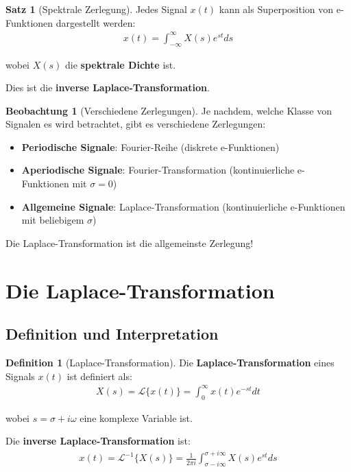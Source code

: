 ﻿\documentclass[a4paper,12pt]{report}
\theoremstyle{definition}
\newtheorem{definition}{Definition}
\newtheorem{satz}{Satz}
\newtheorem{beobachtung}{Beobachtung}
\begin{document}
	\begin{satz}[Spektrale Zerlegung]
		Jedes Signal $x(t)$ kann als Superposition von e-Funktionen dargestellt werden:
		\begin{align}
			x(t) = \int_{-\infty}^{\infty} X(s) e^{st} ds
		\end{align}
		
		wobei $X(s)$ die \textbf{spektrale Dichte} ist.
		
		Dies ist die \textbf{inverse Laplace-Transformation}.
	\end{satz}
	
	\begin{beobachtung}[Verschiedene Zerlegungen]
		Je nachdem, welche Klasse von Signalen es wird betrachtet, gibt es verschiedene Zerlegungen:
		\begin{itemize}
			\item[-] \textbf{Periodische Signale}: Fourier-Reihe (diskrete e-Funktionen)
			\item[-] \textbf{Aperiodische Signale}: Fourier-Transformation (kontinuierliche e-Funktionen mit $\sigma = 0$)
			\item[-] \textbf{Allgemeine Signale}: Laplace-Transformation (kontinuierliche e-Funktionen mit beliebigem $\sigma$)
		\end{itemize}
		
		Die Laplace-Transformation ist die allgemeinste Zerlegung!
	\end{beobachtung}
	
	\section{Die Laplace-Transformation}
	
	\subsection{Definition und Interpretation}
	
	\begin{definition}[Laplace-Transformation]
		Die \textbf{Laplace-Transformation} eines Signals $x(t)$ ist definiert als:
		\begin{align}
			X(s) = \mathcal{L}\{x(t)\} = \int_0^{\infty} x(t) e^{-st} dt
		\end{align}
		
		wobei $s = \sigma + i\omega$ eine komplexe Variable ist.
		
		Die \textbf{inverse Laplace-Transformation} ist:
		\begin{align}
			x(t) = \mathcal{L}^{-1}\{X(s)\} = \frac{1}{2\pi i} \int_{\sigma - i\infty}^{\sigma + i\infty} X(s) e^{st} ds
		\end{align}
	\end{definition}
	
\end{document}
